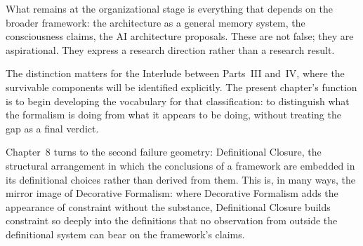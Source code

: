 What remains at the organizational stage is everything
that depends on the broader framework: the \MEMeight{}
architecture as a general memory system, the consciousness
claims, the AI architecture proposals. These are not false;
they are aspirational. They express a research direction
rather than a research result.

The distinction matters for the Interlude between Parts~III
and~IV, where the survivable components will be identified
explicitly. The present chapter's function is to begin
developing the vocabulary for that classification: to
distinguish what the formalism is doing from what it appears
to be doing, without treating the gap as a final verdict.

\medskip

Chapter~8 turns to the second failure geometry: Definitional
Closure, the structural arrangement in which the conclusions
of a framework are embedded in its definitional choices rather
than derived from them. This is, in many ways, the mirror
image of Decorative Formalism: where Decorative Formalism
adds the appearance of constraint without the substance,
Definitional Closure builds constraint so deeply into the
definitions that no observation from outside the definitional
system can bear on the framework's claims.
